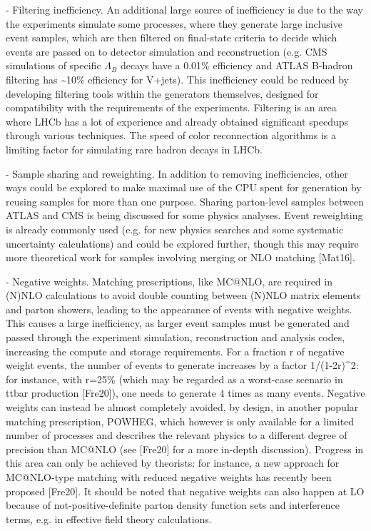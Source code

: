 \documentclass[10pt,a4paper]{article}
\begin{document}
- {Filtering inefficiency}. An additional large source of inefficiency
is due to the way the experiments simulate some processes, where they
generate large inclusive event samples, which are then ﬁltered on
ﬁnal-state criteria to decide which events are passed on to detector
simulation and reconstruction (e.g. CMS simulations of specific
$\Lambda_{B}$ decays have a 0.01\% efficiency and ATLAS B-hadron
filtering has \textasciitilde10\% efficiency for V+jets). This
inefficiency could be reduced by developing ﬁltering tools within the
generators themselves, designed for compatibility with the requirements
of the experiments. Filtering is an area where LHCb has a lot of
experience and already obtained significant speedups through various
techniques. The speed of color reconnection algorithms is a limiting
factor for simulating rare hadron decays in LHCb.

- {Sample sharing and reweighting}. In addition to removing
inefficiencies, other ways could be explored to make maximal use of the
CPU spent for generation by reusing samples for more than one purpose.
Sharing parton-level samples between ATLAS and CMS is being discussed
for some physics analyses. Event reweighting is already commonly used
(e.g. for new physics searches and some systematic uncertainty
calculations) and could be explored further, though this may require
more theoretical work for samples involving merging or NLO matching
{[}Mat16{]}.

- {Negative weights}. Matching prescriptions, like MC@NLO, are required
in (N)NLO calculations to avoid double counting between (N)NLO matrix
elements and parton showers, leading to the appearance of events with
negative weights. This causes a large inefficiency, as larger event
samples must be generated and passed through the experiment simulation,
reconstruction and analysis codes, increasing the compute and storage
requirements. For a fraction r of negative weight events, the number of
events to generate increases by a factor 1/(1-2r)\^{}2: for instance,
with r=25\% (which may be regarded as a worst-case scenario in ttbar
production {[}Fre20{]}), one needs to generate 4 times as many events.
Negative weights can instead be almost completely avoided, by design, in
another popular matching prescription, POWHEG, which however is only
available for a limited number of processes and describes the relevant
physics to a different degree of precision than MC@NLO (see {[}Fre20{]}
for a more in-depth discussion). Progress in this area can only be
achieved by theorists: for instance, a new approach for MC@NLO-type
matching with reduced negative weights has recently been proposed
{[}Fre20{]}. It should be noted that negative weights can also happen at
LO because of not-positive-definite parton density function sets and
interference terms, e.g. in effective field theory calculations.
\end{document}
